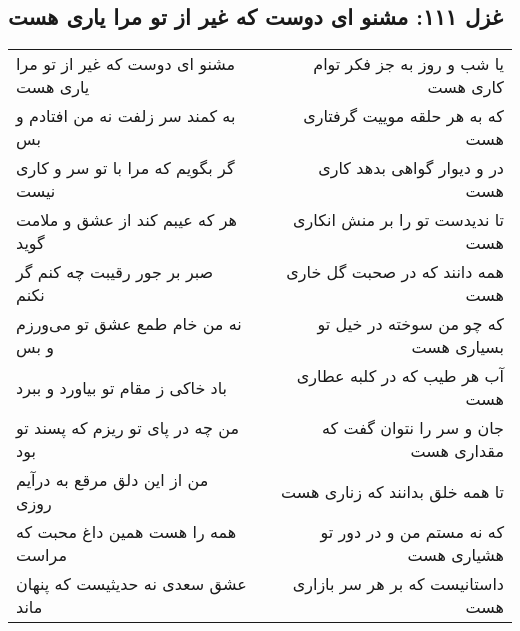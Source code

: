 \begin{center}
\section*{غزل ۱۱۱: مشنو ای دوست که غیر از تو مرا یاری هست}
\label{sec:111}
\begin{longtable}{l p{0.5cm} r}
مشنو ای دوست که غیر از تو مرا یاری هست
&&
یا شب و روز به جز فکر توام کاری هست
\\
به کمند سر زلفت نه من افتادم و بس
&&
که به هر حلقه موییت گرفتاری هست
\\
گر بگویم که مرا با تو سر و کاری نیست
&&
در و دیوار گواهی بدهد کاری هست
\\
هر که عیبم کند از عشق و ملامت گوید
&&
تا ندیدست تو را بر منش انکاری هست
\\
صبر بر جور رقیبت چه کنم گر نکنم
&&
همه دانند که در صحبت گل خاری هست
\\
نه من خام طمع عشق تو می‌ورزم و بس
&&
که چو من سوخته در خیل تو بسیاری هست
\\
باد خاکی ز مقام تو بیاورد و ببرد
&&
آب هر طیب که در کلبه عطاری هست
\\
من چه در پای تو ریزم که پسند تو بود
&&
جان و سر را نتوان گفت که مقداری هست
\\
من از این دلق مرقع به درآیم روزی
&&
تا همه خلق بدانند که زناری هست
\\
همه را هست همین داغ محبت که مراست
&&
که نه مستم من و در دور تو هشیاری هست
\\
عشق سعدی نه حدیثیست که پنهان ماند
&&
داستانیست که بر هر سر بازاری هست
\\
\end{longtable}
\end{center}
